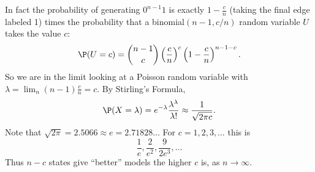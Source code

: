 		In fact the probability of generating $0^{n-1}1$ is exactly $1-\frac{c}n$ (taking the final edge labeled 1) times the probability that a binomial$(n-1,c/n)$ random variable $U$ takes the value $c$:
		\[
			\P(U=c) = \binom{n-1}c \left(\frac{c}n\right)^{c}\left(1-\frac{c}n\right)^{n-1-c}.
		\]
		So we are in the limit looking at a Poisson random variable with $\lambda=\lim_n (n-1)\frac{c}n=c$. By Stirling's Formula,
		\[
			\P(X=\lambda) = e^{-\lambda}\frac{\lambda^\lambda}{\lambda!} \approx \frac1{\sqrt{2\pi c}}.
		\]
		Note that $\sqrt{2\pi}=2.5066\approx e=2.71828\dots$
		For $c=1,2,3,\dots$ this is
		\[
			\frac1e, \frac2{e^2}, \frac{9}{2e^3},\dots
		\]
		Thus $n-c$ states give ``better'' models the higher $c$ is, as $n\to\infty$.
